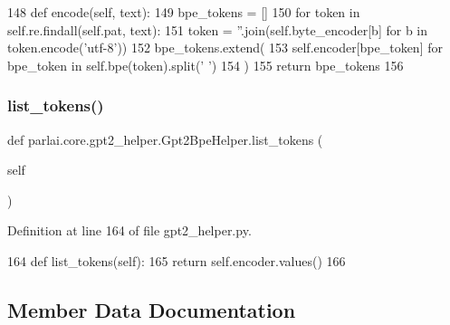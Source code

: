 \begin{DoxyCode}
148     \textcolor{keyword}{def }encode(self, text):
149         bpe\_tokens = []
150         \textcolor{keywordflow}{for} token \textcolor{keywordflow}{in} self.re.findall(self.pat, text):
151             token = \textcolor{stringliteral}{''}.join(self.byte\_encoder[b] \textcolor{keywordflow}{for} b \textcolor{keywordflow}{in} token.encode(\textcolor{stringliteral}{'utf-8'}))
152             bpe\_tokens.extend(
153                 self.encoder[bpe\_token] \textcolor{keywordflow}{for} bpe\_token \textcolor{keywordflow}{in} self.bpe(token).split(\textcolor{stringliteral}{' '})
154             )
155         \textcolor{keywordflow}{return} bpe\_tokens
156 
\end{DoxyCode}
\mbox{\label{classparlai_1_1core_1_1gpt2__helper_1_1Gpt2BpeHelper_a36f3a5cb4264010b4891605508147442}} 
\subsubsection{\texorpdfstring{list\+\_\+tokens()}{list\_tokens()}}
{\footnotesize\ttfamily def parlai.\+core.\+gpt2\+\_\+helper.\+Gpt2\+Bpe\+Helper.\+list\+\_\+tokens (\begin{DoxyParamCaption}\item[{}]{self }\end{DoxyParamCaption})}



Definition at line 164 of file gpt2\+\_\+helper.\+py.


\begin{DoxyCode}
164     \textcolor{keyword}{def }list\_tokens(self):
165         \textcolor{keywordflow}{return} self.encoder.values()
166 \end{DoxyCode}


\subsection{Member Data Documentation}
\mbox{\label{classparlai_1_1core_1_1gpt2__helper_1_1Gpt2BpeHelper_a3138a0a7614de78ee773642fbe6ddaae}} 
